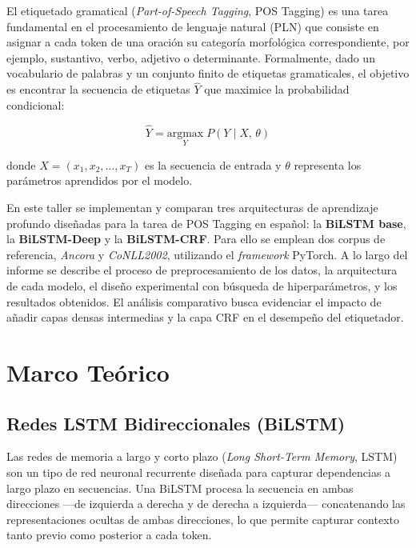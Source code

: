 \documentclass[12pt, a4paper]{article}
\begin{document}
El etiquetado gramatical (\textit{Part-of-Speech Tagging}, POS Tagging) es una tarea
fundamental en el procesamiento de lenguaje natural (PLN) que consiste en asignar
a cada token de una oración su categoría morfológica correspondiente, por ejemplo,
sustantivo, verbo, adjetivo o determinante. Formalmente, dado un vocabulario de
palabras y un conjunto finito de etiquetas gramaticales, el objetivo es encontrar la
secuencia de etiquetas $\hat{Y}$ que maximice la probabilidad condicional:

\begin{equation}
    \hat{Y} = \underset{Y}{\mathrm{argmax}}\; P(Y \mid X,\, \theta)
\end{equation}

\noindent donde $X = (x_1, x_2, \ldots, x_T)$ es la secuencia de entrada y
$\theta$ representa los parámetros aprendidos por el modelo.

En este taller se implementan y comparan tres arquitecturas de aprendizaje profundo
diseñadas para la tarea de POS Tagging en español: la \textbf{BiLSTM base},
la \textbf{BiLSTM-Deep} y la \textbf{BiLSTM-CRF}. Para ello se emplean dos
corpus de referencia, \textit{Ancora} y \textit{CoNLL2002}, utilizando el
\textit{framework} PyTorch. A lo largo del informe se describe el proceso de
preprocesamiento de los datos, la arquitectura de cada modelo, el diseño
experimental con búsqueda de hiperparámetros, y los resultados obtenidos. El
análisis comparativo busca evidenciar el impacto de añadir capas densas
intermedias y la capa CRF en el desempeño del etiquetador.

\section{Marco Teórico}

\subsection{Redes LSTM Bidireccionales (BiLSTM)}

Las redes de memoria a largo y corto plazo (\textit{Long Short-Term Memory},
LSTM) son un tipo de red neuronal recurrente diseñada para capturar dependencias
a largo plazo en secuencias. Una BiLSTM procesa la secuencia en ambas
direcciones —de izquierda a derecha y de derecha a izquierda— concatenando las
representaciones ocultas de ambas direcciones, lo que permite capturar contexto
tanto previo como posterior a cada token.
\end{document}
